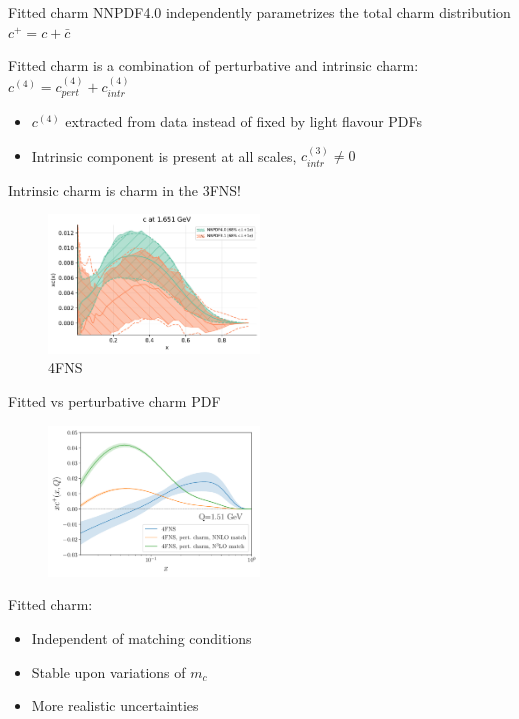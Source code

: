 \documentclass[aspectratio=43, 8pt,t]{beamer}
\begin{document}
\begin{frame}{Fitted charm}
  NNPDF4.0 independently parametrizes the total charm distribution $c^+=c+\bar{c}$

  \vspace*{1em}
  Fitted charm is a combination of perturbative and intrinsic charm: \\
  $c^{(4)} = c_{pert}^{(4)}+c_{intr}^{(4)}$
  \begin{itemize}
    \item $c^{(4)}$ extracted from data instead of fixed by light flavour PDFs
    \item Intrinsic component is present at all scales, $c_{intr}^{(3)}\neq 0$
  \end{itemize}

  \vspace*{1em}
  Intrinsic charm is charm in the 3FNS!

  \begin{figure}
    \includegraphics[width=0.5\textwidth]{nnpdf40_vs_nnpdf31.pdf}
    \caption*{4FNS}
  \end{figure}
\end{frame}

\begin{frame}{Fitted vs perturbative charm PDF}
  \begin{figure}
    \includegraphics[width=0.5\textwidth]{pch_vs_fitted_forward.pdf}
  \end{figure}

  Fitted charm:
  \begin{itemize}
    \item Independent of matching conditions
    \item Stable upon variations of $m_c$
    \item More realistic uncertainties
  \end{itemize}
\end{frame}
\end{document}

